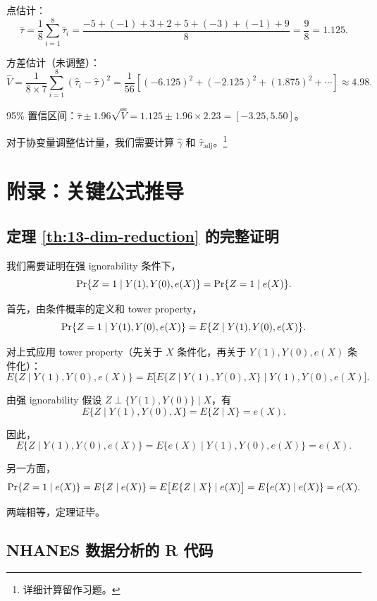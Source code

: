 点估计：
\[
\hat\tau = \frac{1}{8} \sum_{i=1}^8 \hat\tau_i = \frac{-5 + (-1) + 3 + 2 + 5 + (-3) + (-1) + 9}{8} = \frac{9}{8} = 1.125.
\]

方差估计（未调整）：
\[
\hat V = \frac{1}{8 \times 7} \sum_{i=1}^8 (\hat\tau_i - \hat\tau)^2 = \frac{1}{56} \left[(-6.125)^2 + (-2.125)^2 + (1.875)^2 + \cdots\right] \approx 4.98.
\]

95\% 置信区间：$\hat\tau \pm 1.96 \sqrt{\hat V} = 1.125 \pm 1.96 \times 2.23 = [-3.25, 5.50]$。

对于协变量调整估计量，我们需要计算 $\hat\gamma$ 和 $\hat\tau_{\text{adj}}$。\footnote{详细计算留作习题。}

\section{附录：关键公式推导}\label{sec:appendix-13}

\subsection{定理 \ref{th:13-dim-reduction} 的完整证明}\label{sec:appendix-13-proof-dim-reduction}

我们需要证明在强 ignorability 条件下，
\[
\operatorname{Pr}\{Z=1 \mid Y(1), Y(0), e(X)\} = \operatorname{Pr}\{Z=1 \mid e(X)\}.
\]

首先，由条件概率的定义和 tower property，
\[
\operatorname{Pr}\{Z=1 \mid Y(1), Y(0), e(X)\} = E\{Z \mid Y(1), Y(0), e(X)\}.
\]

对上式应用 tower property（先关于 $X$ 条件化，再关于 $Y(1), Y(0), e(X)$ 条件化）：
\[
E\{Z \mid Y(1), Y(0), e(X)\} = E\big[ E\{Z \mid Y(1), Y(0), X\} \mid Y(1), Y(0), e(X) \big].
\]

由强 ignorability 假设 $Z \perp \{Y(1), Y(0)\} \mid X$，有
\[
E\{Z \mid Y(1), Y(0), X\} = E\{Z \mid X\} = e(X).
\]

因此，
\[
E\{Z \mid Y(1), Y(0), e(X)\} = E\{e(X) \mid Y(1), Y(0), e(X)\} = e(X).
\]

另一方面，
\[
\operatorname{Pr}\{Z=1 \mid e(X)\} = E\{Z \mid e(X)\} = E\big[ E\{Z \mid X\} \mid e(X) \big] = E\{e(X) \mid e(X)\} = e(X).
\]

两端相等，定理证毕。

\subsection{NHANES 数据分析的 R 代码}\label{sec:appendix-13-r-code}


